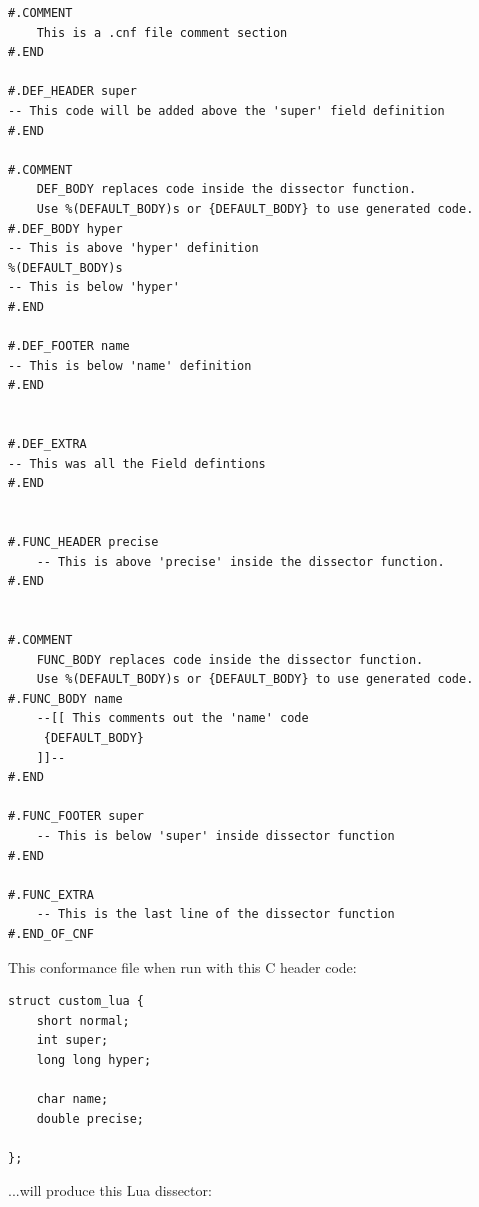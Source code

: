 \documentclass[A4paper,10pt,english]{sphinxmanual}
\begin{document}
\begin{Verbatim}[commandchars=\\\{\}]
#.COMMENT
    This is a .cnf file comment section
#.END

#.DEF_HEADER super
-- This code will be added above the 'super' field definition
#.END

#.COMMENT
    DEF_BODY replaces code inside the dissector function.
    Use %(DEFAULT_BODY)s or {DEFAULT_BODY} to use generated code.
#.DEF_BODY hyper
-- This is above 'hyper' definition
%(DEFAULT_BODY)s
-- This is below 'hyper'
#.END

#.DEF_FOOTER name
-- This is below 'name' definition
#.END


#.DEF_EXTRA
-- This was all the Field defintions
#.END


#.FUNC_HEADER precise
    -- This is above 'precise' inside the dissector function.
#.END


#.COMMENT
    FUNC_BODY replaces code inside the dissector function.
    Use %(DEFAULT_BODY)s or {DEFAULT_BODY} to use generated code.
#.FUNC_BODY name
    --[[ This comments out the 'name' code
     {DEFAULT_BODY}
    ]]--
#.END

#.FUNC_FOOTER super
    -- This is below 'super' inside dissector function
#.END

#.FUNC_EXTRA
    -- This is the last line of the dissector function
#.END_OF_CNF
\end{Verbatim}

This conformance file when run with this C header code:

\begin{Verbatim}[commandchars=\\\{\}]
struct custom_lua {
    short normal;
    int super;
    long long hyper;

    char name;
    double precise;

};
\end{Verbatim}

...will produce this Lua dissector:
\end{document}
